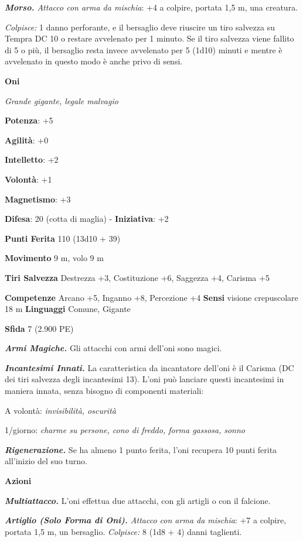\begin{multicols}{2}
\emph{\textbf{Morso.} Attacco con arma da mischia}: +4 a colpire,
portata 1,5 m, una creatura.

\emph{Colpisce:} 1 danno perforante, e il bersaglio deve riuscire un
tiro salvezza su Tempra DC 10 o restare avvelenato per 1 minuto.
Se il tiro salvezza viene fallito di 5 o più, il bersaglio resta invece
avvelenato per 5 (1d10) minuti e mentre è avvelenato in questo modo è
anche privo di sensi.



\textbf{Oni}

\emph{Grande gigante, legale malvagio}

\textbf{Potenza}: +5

\textbf{Agilità}: +0

\textbf{Intelletto}: +2

\textbf{Volontà}: +1

\textbf{Magnetismo}: +3

\textbf{Difesa}: 20 (cotta di maglia) - \textbf{Iniziativa}: +2

\textbf{Punti Ferita} 110 (13d10 + 39)

\textbf{Movimento} 9 m, volo 9 m  

\textbf{Tiri Salvezza} Destrezza +3, Costituzione +6, Saggezza +4,
Carisma +5

\textbf{Competenze} Arcano +5, Inganno +8, Percezione +4 \textbf{Sensi}
visione crepuscolare 18 m \textbf{Linguaggi} Comune,
Gigante

\textbf{Sfida} 7 (2.900 PE)

\emph{\textbf{Armi Magiche.}} Gli attacchi con armi dell'oni sono
magici.

\emph{\textbf{Incantesimi Innati.}} La caratteristica da incantatore
dell'oni è il Carisma (DC dei tiri salvezza degli incantesimi 13). L'oni
può lanciare questi incantesimi in maniera innata, senza bisogno di
componenti materiali:

A volontà: \emph{invisibilità, oscurità}

1/giorno: \emph{charme su persone, cono di freddo, forma gassosa,}
\emph{sonno}

\emph{\textbf{Rigenerazione.}} Se ha almeno 1 punto ferita, l'oni
recupera 10 punti ferita all'inizio del suo turno.

\textbf{Azioni}

\emph{\textbf{Multiattacco.}} L'oni effettua due attacchi, con gli
artigli o con il falcione.

\emph{\textbf{Artiglio (Solo Forma di Oni).} Attacco con arma da
mischia}: +7 a colpire, portata 1,5 m, un bersaglio. \emph{Colpisce:} 8
(1d8 + 4) danni taglienti.


\end{multicols}
